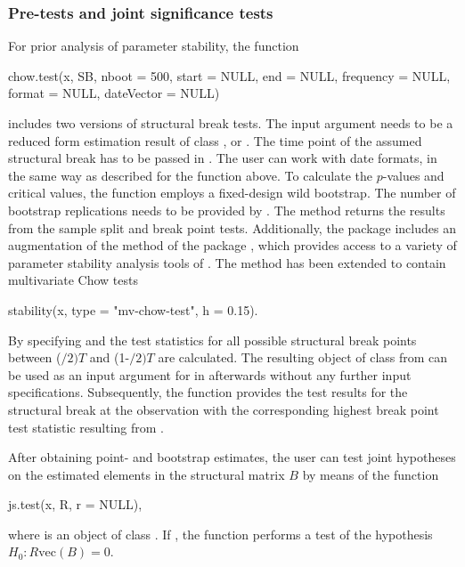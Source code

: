\documentclass[nojss]{jss}\usepackage[]{graphicx}\usepackage[]{color}
\begin{document}
\subsubsection{Pre-tests and joint significance tests}

For prior analysis of parameter stability, the function
\begin{CodeChunk}
\begin{CodeInput}
chow.test(x, SB, nboot = 500, start = NULL, end = NULL,
  frequency = NULL, format = NULL, dateVector = NULL)
\end{CodeInput}
\end{CodeChunk}
includes two versions of structural break tests. The input argument  needs to be a reduced form estimation result of class ,  or . The time point of the assumed structural break has to be passed in . The user can work with date formats, in the same way as described for the  function above. To calculate the $p$-values and critical values, the function employs a fixed-design wild bootstrap. The number of bootstrap replications needs to be provided by . The  method returns the results from the sample split and break point tests. Additionally, the package includes an augmentation of the  method of the  package \citep{pfaff2008}, which provides access to a variety of parameter stability analysis tools of  \citep{zeileis2002}. The method has been extended to contain multivariate Chow tests
\begin{CodeChunk}
\begin{CodeInput}
stability(x, type = "mv-chow-test", h = 0.15).
\end{CodeInput}
\end{CodeChunk}
By specifying  and  the test statistics for all possible structural break points between ($/2)T$ and (1-$/2)T$ are calculated. The resulting object of class  from  can be used as an input argument for  in  afterwards without any further input specifications. Subsequently, the function provides the test results for the structural break at the observation with the corresponding highest break point test statistic resulting from .

After obtaining point- and bootstrap estimates, the user can test joint hypotheses on the estimated elements in the structural matrix $B$ by means of the function
\begin{CodeChunk}
\begin{CodeInput}
js.test(x, R, r = NULL),
\end{CodeInput}
\end{CodeChunk}
where  is an object of class . If ,  the function performs a test of the hypothesis $H_0 : R\mbox{vec}(B) = 0$.
\end{document}
